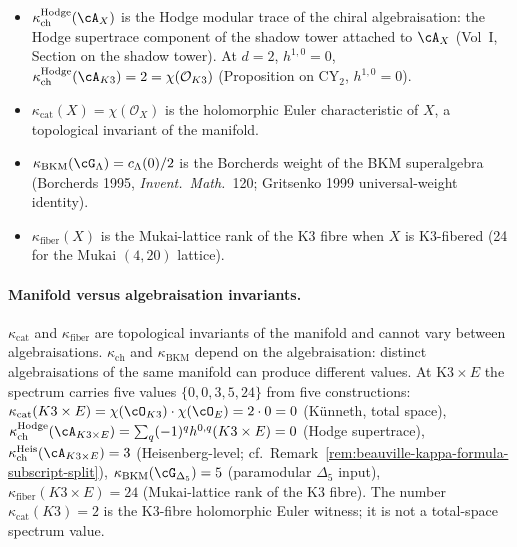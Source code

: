 \begin{itemize}
\item $\kappa_{\mathrm{ch}}^{\mathrm{Hodge}}(\cA_X)$ is the Hodge modular trace of the
chiral algebraisation: the Hodge supertrace component of the shadow tower
 attached to $\cA_X$ (Vol~I, Section on the shadow tower). At
 $d = 2$, $h^{1,0} = 0$, $\kappa_{\mathrm{ch}}^{\mathrm{Hodge}}(\cA_{K3}) = 2 =
 \chi(\mathcal{O}_{K3})$ (Proposition on $\mathrm{CY}_2$,
 $h^{1,0} = 0$).
 \item $\kappa_{\mathrm{cat}}(X) = \chi(\mathcal{O}_X)$ is the holomorphic
 Euler characteristic of $X$, a topological invariant of the manifold.
 \item $\kappa_{\mathrm{BKM}}(\cG_{\Lambda}) = c_{\Lambda}(0)/2$ is the
 Borcherds weight of the BKM superalgebra (Borcherds 1995, \emph{Invent.\ Math.}\ 120;
 Gritsenko 1999 universal-weight identity).
 \item $\kappa_{\mathrm{fiber}}(X)$ is the Mukai-lattice rank of the K3
 fibre when $X$ is K3-fibered (24 for the Mukai $(4, 20)$ lattice).
\end{itemize}

\paragraph{Manifold versus algebraisation invariants.}
$\kappa_{\mathrm{cat}}$ and $\kappa_{\mathrm{fiber}}$ are topological
invariants of the manifold and cannot vary between algebraisations.
$\kappa_{\mathrm{ch}}$ and $\kappa_{\mathrm{BKM}}$ depend on the
algebraisation: distinct algebraisations of the same manifold can produce
different values. At K$3 \times E$ the spectrum carries five values
$\{0, 0, 3, 5, 24\}$ from five constructions:
$\kappa_{\mathrm{cat}}(K3 \times E) = \chi(\cO_{K3})\cdot\chi(\cO_E) = 2 \cdot 0 = 0$
\textup{(}K\"unneth, total
space\textup{)},
$\kappa_{\mathrm{ch}}^{\mathrm{Hodge}}(\cA_{K3 \times E}) =
 \sum_q(-1)^q h^{0,q}(K3 \times E) = 0$ \textup{(}Hodge supertrace\textup{)},
$\kappa_{\mathrm{ch}}^{\mathrm{Heis}}(\cA_{K3 \times E}) = 3$ \textup{(}Heisenberg-level; cf.\ Remark~\ref{rem:beauville-kappa-formula-subscript-split}\textup{)},
$\kappa_{\mathrm{BKM}}(\cG_{\Delta_5}) = 5$ \textup{(}paramodular $\Delta_5$ input\textup{)},
$\kappa_{\mathrm{fiber}}(K3 \times E) = 24$ \textup{(}Mukai-lattice rank of the K3
fibre\textup{).} The number $\kappa_{\mathrm{cat}}(K3) = 2$ is the K3-fibre
holomorphic Euler witness; it is not a total-space spectrum value.

